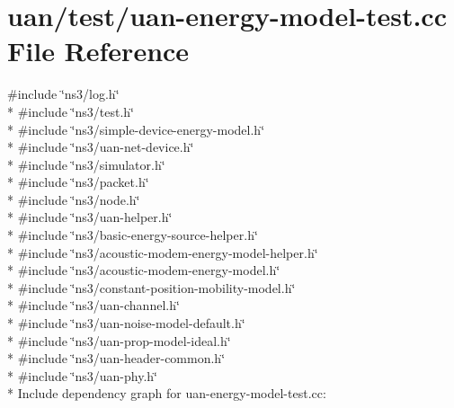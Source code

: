 \hypertarget{uan-energy-model-test_8cc}{}\section{uan/test/uan-\/energy-\/model-\/test.cc File Reference}
\label{uan-energy-model-test_8cc}
{\ttfamily \#include \char`\"{}ns3/log.\+h\char`\"{}}\\*
{\ttfamily \#include \char`\"{}ns3/test.\+h\char`\"{}}\\*
{\ttfamily \#include \char`\"{}ns3/simple-\/device-\/energy-\/model.\+h\char`\"{}}\\*
{\ttfamily \#include \char`\"{}ns3/uan-\/net-\/device.\+h\char`\"{}}\\*
{\ttfamily \#include \char`\"{}ns3/simulator.\+h\char`\"{}}\\*
{\ttfamily \#include \char`\"{}ns3/packet.\+h\char`\"{}}\\*
{\ttfamily \#include \char`\"{}ns3/node.\+h\char`\"{}}\\*
{\ttfamily \#include \char`\"{}ns3/uan-\/helper.\+h\char`\"{}}\\*
{\ttfamily \#include \char`\"{}ns3/basic-\/energy-\/source-\/helper.\+h\char`\"{}}\\*
{\ttfamily \#include \char`\"{}ns3/acoustic-\/modem-\/energy-\/model-\/helper.\+h\char`\"{}}\\*
{\ttfamily \#include \char`\"{}ns3/acoustic-\/modem-\/energy-\/model.\+h\char`\"{}}\\*
{\ttfamily \#include \char`\"{}ns3/constant-\/position-\/mobility-\/model.\+h\char`\"{}}\\*
{\ttfamily \#include \char`\"{}ns3/uan-\/channel.\+h\char`\"{}}\\*
{\ttfamily \#include \char`\"{}ns3/uan-\/noise-\/model-\/default.\+h\char`\"{}}\\*
{\ttfamily \#include \char`\"{}ns3/uan-\/prop-\/model-\/ideal.\+h\char`\"{}}\\*
{\ttfamily \#include \char`\"{}ns3/uan-\/header-\/common.\+h\char`\"{}}\\*
{\ttfamily \#include \char`\"{}ns3/uan-\/phy.\+h\char`\"{}}\\*
Include dependency graph for uan-\/energy-\/model-\/test.cc\+:
